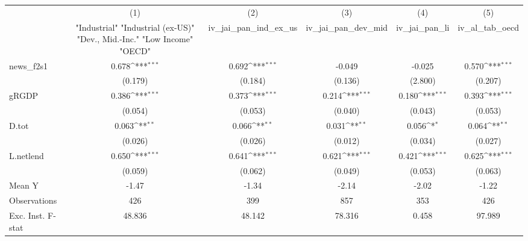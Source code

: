 {
\def\sym#1{\ifmmode^{#1}\else\(^{#1}\)\fi}
\begin{tabular}{l*{5}{c}}
\toprule
            &\multicolumn{1}{c}{(1)}&\multicolumn{1}{c}{(2)}&\multicolumn{1}{c}{(3)}&\multicolumn{1}{c}{(4)}&\multicolumn{1}{c}{(5)}\\
            &\multicolumn{1}{c}{ "Industrial" "Industrial (ex-US)" "Dev., Mid.-Inc." "Low Income" "OECD" }&\multicolumn{1}{c}{iv\_jai\_pan\_ind\_ex\_us}&\multicolumn{1}{c}{iv\_jai\_pan\_dev\_mid}&\multicolumn{1}{c}{iv\_jai\_pan\_li}&\multicolumn{1}{c}{iv\_al\_tab\_oecd}\\
\midrule
news\_f2s1   &       0.678\sym{***}&       0.692\sym{***}&      -0.049         &      -0.025         &       0.570\sym{***}\\
            &     (0.179)         &     (0.184)         &     (0.136)         &     (2.800)         &     (0.207)         \\
\addlinespace
gRGDP       &       0.386\sym{***}&       0.373\sym{***}&       0.214\sym{***}&       0.180\sym{***}&       0.393\sym{***}\\
            &     (0.054)         &     (0.053)         &     (0.040)         &     (0.043)         &     (0.053)         \\
\addlinespace
D.tot       &       0.063\sym{**} &       0.066\sym{**} &       0.031\sym{**} &       0.056\sym{*}  &       0.064\sym{**} \\
            &     (0.026)         &     (0.026)         &     (0.012)         &     (0.034)         &     (0.027)         \\
\addlinespace
L.netlend   &       0.650\sym{***}&       0.641\sym{***}&       0.621\sym{***}&       0.421\sym{***}&       0.625\sym{***}\\
            &     (0.059)         &     (0.062)         &     (0.049)         &     (0.053)         &     (0.063)         \\
\midrule
Mean Y      &       -1.47         &       -1.34         &       -2.14         &       -2.02         &       -1.22         \\
Observations&         426         &         399         &         857         &         353         &         426         \\
Exc. Inst. F-stat&      48.836         &      48.142         &      78.316         &       0.458         &      97.989         \\
\bottomrule
\end{tabular}
}
